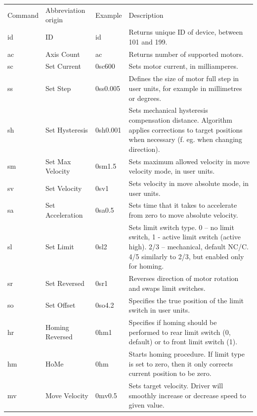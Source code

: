 \documentclass[10pt,article]{article}
\begin{document}
\begin{table}[ht] \centering
\begin{tabularx}{\textwidth}{lllX}
\rowcolor[gray]{0.80} Command & Abbreviation origin & Example & Description\\
\rowcolor[gray]{0.90} id & ID & id & Returns unique ID of device, between 101 and 199.\\
\rowcolor[gray]{0.95} ac & Axis Count & ac & Returns number of supported motors.\\
\rowcolor[gray]{0.90} sc & Set Current & 0sc600 &Sets motor current, in milliamperes.\\
\rowcolor[gray]{0.95} ss & Set Step & 0ss0.005 & Defines the size of motor full step in user units, for example in millimetres or degrees. \\
\rowcolor[gray]{0.90} sh & Set Hysteresis & 0sh0.001 & Sets mechanical hysteresis compensation distance. Algorithm applies corrections to target positions when necessary (f. eg. when changing direction). \\
\rowcolor[gray]{0.95} sm & Set Max Velocity & 0sm1.5 & Sets maximum allowed velocity in move velocity mode, in user units. \\
\rowcolor[gray]{0.90} sv & Set Velocity & 0sv1 & Sets velocity in move absolute mode, in user units. \\
\rowcolor[gray]{0.95} sa & Set Acceleration & 0sa0.5 & Sets time that it takes to accelerate from zero to move absolute velocity. \\
\rowcolor[gray]{0.90} sl & Set Limit & 0sl2 & Sets limit switch type. 0 – no limit switch, 1 - active limit switch (active high). 2/3 – mechanical, default NC/C. 4/5 similarly to 2/3, but enabled only for homing. \\
\rowcolor[gray]{0.95} sr & Set Reversed & 0sr1 & Reverses direction of motor rotation and swaps limit switches. \\
\rowcolor[gray]{0.90} so & Set Offset & 0so4.2 & Specifies the true position of the limit switch in user units. \\
\rowcolor[gray]{0.95} hr & Homing Reversed & 0hm1 & Specifies if homing should be performed to rear limit switch (0, default) or to front limit switch (1).\\
\rowcolor[gray]{0.90} hm & HoMe & 0hm & Starts homing procedure. If limit type is set to zero, then it only corrects current position to be zero. \\
\rowcolor[gray]{0.95} mv & Move Velocity & 0mv0.5 & Sets target velocity. Driver will smoothly increase or decrease speed to given value. \\

\end{tabularx}
\end{table}
\end{document}

